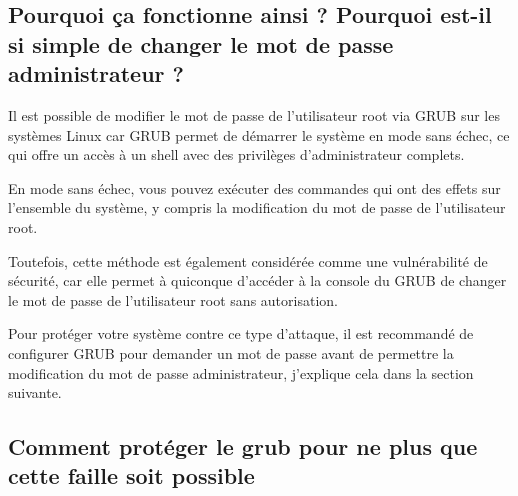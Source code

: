 \documentclass[12pt,a4paper]{article}
\begin{document}
   \subsection{Pourquoi ça fonctionne ainsi ? Pourquoi est-il si simple de changer le mot de passe administrateur ?} 
   \begin{flushleft}
       \noindent Il est possible de modifier le mot de passe de l'utilisateur root via GRUB sur les systèmes Linux car GRUB permet de démarrer le système en mode sans échec, ce qui offre un accès à un shell avec des privilèges d'administrateur complets. 
       \item En mode sans échec, vous pouvez exécuter des commandes qui ont des effets sur l'ensemble du système, y compris la modification du mot de passe de l'utilisateur root.
       \item Toutefois, cette méthode est également considérée comme une vulnérabilité de sécurité, car elle permet à quiconque d'accéder à la console du GRUB de changer le mot de passe de l'utilisateur root sans autorisation.
       \item Pour protéger votre système contre ce type d'attaque, il est recommandé de configurer GRUB pour demander un mot de passe avant de permettre la modification du mot de passe administrateur, j'explique cela dans la section suivante.
   \end{flushleft}

   \subsection{Comment protéger le grub pour ne plus que cette faille soit possible} 
\end{document}
